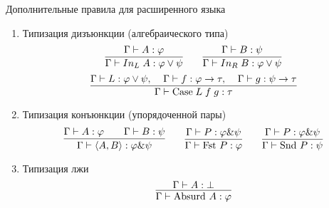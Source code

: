 \documentclass[aspectratio=169]{beamer}
\begin{document}
\begin{frame}{Дополнительные правила для расширенного языка}
\begin{enumerate}
	\item Типизация дизъюнкции (алгебраического типа)\[
	\infer{\Gamma \vdash In_L \; A: \varphi \vee \psi}{\Gamma\vdash A: \varphi}
	\quad\quad
	\infer{\Gamma \vdash In_R \; B: \varphi \vee \psi}{\Gamma\vdash B: \psi}
	\]\vspace{-0.5cm}
	\[
	\infer{\Gamma \vdash \text{Case} \; L \; f \; g : \tau}{\Gamma \vdash L: \varphi \vee \psi, \;\;\;\; \Gamma \vdash f : \varphi \to \tau, \;\;\;\; \Gamma \vdash g: \psi \to \tau}
	\]

	\item Типизация конъюнкции (упорядоченной пары)
	\[
	\infer{\Gamma \vdash \langle A, B \rangle : \varphi \text{\&} \psi}{\Gamma\vdash A: \varphi && \Gamma\vdash B: \psi}
	\quad\quad
	\infer{\Gamma \vdash \text{Fst}\ P : \varphi}{\Gamma \vdash P: \varphi \text{\&} \psi}
	\quad\quad
	\infer{\Gamma \vdash \text{Snd}\ P : \psi}{\Gamma \vdash P: \varphi \text{\&} \psi}
	\]

	\item Типизация лжи
	\[
	\infer{\Gamma \vdash \text{Absurd}\ A : \varphi}{\Gamma \vdash A : \bot}
	\]
\end{enumerate}
\end{frame}
\end{document}
